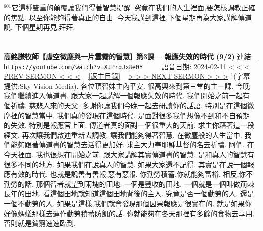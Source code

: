 \documentclass{book}
\begin{document}
$^{601}$它這種雙重的顛覆讓我們得著智慧提醒.
究竟在我們的人生裡面,要怎樣調教正確的焦點.
以至你能夠得著真正的自由.
今天我講到這裡,下個星期再為大家講解傳道說.
下個星期再見,拜拜.
\newpage



\section{}
\label{sec:XJPrqJx8e0Y}
\textbf{高銘謙牧師【虛空微塵與一片雲霧的智慧】第3課 ─ 報應失效的時代 (9/2)}
\newline
\newline
連結: \href{https://youtube.com/watch?v=XJPrqJx8e0Y}{\texttt{ https://youtube.com/watch?v=XJPrqJx8e0Y}} ~~~~ 語音日期: 2024-02-11 
\newline
\newline
\hyperref[sec:3IzV5i5HZqA]{\small{< < < PREV SERMON < < <}}
~
\hyperref[sec:index]{\small{[返主目錄]}}
~
\hyperref[sec:_CzKRoa8y_w]{\small{> > > NEXT SERMON > > >}}
\newline
\newline
$^{1}$(字幕提供:Sky Vision Media).
各位頂智妹主內平安.
很高興來到第三堂的主一課.
今晚我們繼續進入傳道書.
跟大家一起講解一個報應失效的時代.
我們開始之前一起有個祈禱.
慈悲人來的天父.
多謝你讓我們今晚一起去研讀你的話語.
特別是在這個微塵裡的智慧當中.
我們真的發現在這個時代.
是面對很多我們想像不到和不自預期的失效.
特別是報應官上面.
傳道者真的面對一個很重大的天前.
求主你藉著這一段經文.
再次讓我們啟迪重新去調教.
讓我們能夠得著智慧.
在微塵般的人生當中.
我們能夠跟著傳道書的智慧去活得更加好.
求主大力奉耶穌基督的名去祈禱.
阿們.
在今天裡面.
我也很想在開始之前.
跟大家講解其實傳道書的智慧.
是和真人的智慧有很多不同的地方.
如果我們在說真人的智慧.
如果大家還不記得.
其實是在說一個報應有效的時代.
也就是說善有善報,惡有惡報.
你勤勞積蓄,你就能夠富裕.
相反,你不勤勞的話.
那個智者就望到兩塊的田地.
一個是豐收的田地.
一個就是一個叫做荊棘長年的田地.
看這個田地就知道這個田地背後的主人.
究竟是否一個勤勞的人.
還是一個不勤勞的人.
如果是這樣,我們就會發現那個因果報應是很實在的.
就是如果你好像螞蟻那樣去運作勤勞積蓄防飢的話.
你就能夠在冬天那裡有多餘的食物去享用.
否則就是貧窮速速臨到.
\end{document}
